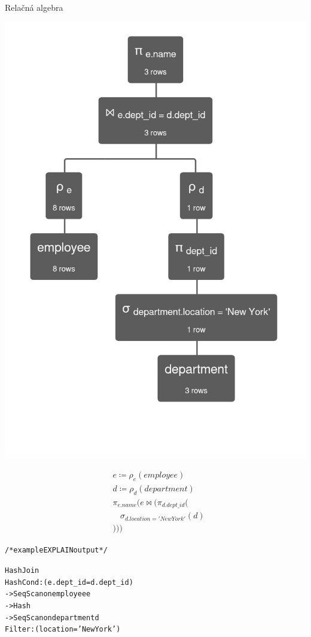 \documentclass[12pt]{beamer}
\begin{document}
\begin{frame}[fragile]{Relačná algebra}
\begin{minipage}{.5\textwidth}
\includegraphics[scale=.18]{query4.jpg}
\end{minipage}
\begin{minipage}{.45\textwidth}
\begin{align*}
& e \coloneqq \rho_e(employee) \\
& d \coloneqq \rho_d(department) \\
& \pi_{e.name}(e \bowtie (\pi_{d.dept\_id}( \\
& \phantom{\ \ \ \ } \sigma_{d.location = 'New York'}(d) \\
& )))
\end{align*}
\smallskip

\begin{scriptsize}
\begin{alltt}
/* example EXPLAIN output */

Hash Join
  Hash Cond: (e.dept_id = d.dept_id)
  -> Seq Scan on employee e
  -> Hash
    -> Seq Scan on department d
       Filter: (location = 'New York')
\end{alltt}
\end{scriptsize}
\end{minipage}
\end{frame}
\end{document}
